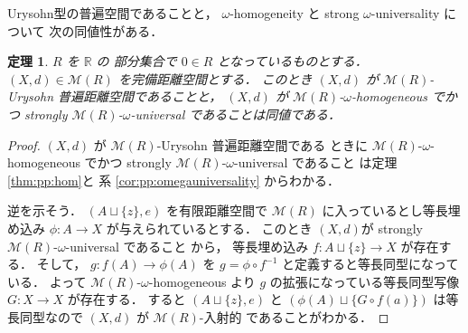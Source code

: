 \documentclass[leqno, 12pt]{jsarticle}
\newtheorem{thm}{定理}[section]
\newcommand{\rr}{\mathbb{R}}
\begin{document}
Urysohn型の普遍空間であることと，
$\omega$-homogeneity
と
strong 
$\omega$-universality
について
次の同値性がある．
\begin{thm}\label{thm:pp:equiv}
$R$
を
$\rr$
の
部分集合で
$0\in R$
となっているものとする．
$(X, d)\in \mathscr{M}(R)$
を完備距離空間とする．
このとき
$(X, d)$
が
$\mathscr{M}(R)$-Urysohn
普遍距離空間であることと，
$(X, d)$
が
$\mathscr{M}(R)$-$\omega$-homogeneous
でかつ
strongly $\mathscr{M}(R)$-$\omega$-universal
であることは同値である．
\end{thm}
\begin{proof}
$(X, d)$
が
$\mathscr{M}(R)$-Urysohn
普遍距離空間である
ときに
$\mathscr{M}(R)$-$\omega$-homogeneous
でかつ
strongly $\mathscr{M}(R)$-$\omega$-universal
であること
は定理 
\ref{thm:pp:hom}と
系
 \ref{cor:pp:omegauniversality}
からわかる．

逆を示そう．
$(A\sqcup\{z\}, e)$
を有限距離空間で
$\mathscr{M}(R)$
に入っているとし等長埋め込み
$\phi\colon  A\to X$
が与えられているとする．
このとき
$(X, d)$が
strongly 
$\mathscr{M}(R)$-$\omega$-universal
であること
から，
等長埋め込み
$f\colon  A\sqcup \{z\}\to X$
が存在する．
そして，
$g\colon  f(A)\to \phi(A)$
を
$g=\phi\circ f^{-1}$
と定義すると等長同型になっている．
よって
$\mathscr{M}(R)$-$\omega$-homogeneous
より
$g$
の拡張になっている等長同型写像
$G\colon  X\to X$
が存在する．
すると
$(A\sqcup \{z\}, e)$
と
$(\phi(A)\sqcup\{G\circ f(a)\})$
は等長同型なので
$(X, d)$
が
$\mathscr{M}(R)$-入射的
であることがわかる．
\end{proof}
\end{document}
